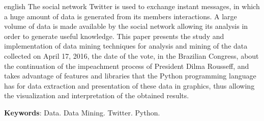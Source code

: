 \begin{resumo}[ABSTRACT]
 \begin{otherlanguage*}{english}
The social network Twitter is used to exchange instant messages, in which a huge amount of data is generated from its members interactions. A large volume of data is made available by the social network allowing its analysis in order to generate useful knowledge. This paper presents the study and implementation of data mining techniques for analysis and mining of the data collected on April 17, 2016, the date of the vote, in the Brazilian Congress, about the continuation of the impeachment process of President Dilma Rousseff, and takes advantage of features and libraries that the Python programming language has for data extraction and presentation of these data in graphics, thus allowing the visualization and interpretation of the obtained results.
   
   \vspace{\onelineskip}
 
   \noindent 
   \textbf{Keywords}: Data. Data Mining. Twitter. Python.
 \end{otherlanguage*}
\end{resumo}